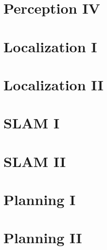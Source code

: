 \documentclass[8pt,landscape]{article}
\begin{document}
\begin{multicols}{3}
\blindtext[3]

\section{Perception IV}

\blindtext[3]

\section{Localization I}

\blindtext[3]

\section{Localization II}

\blindtext[3]

\section{SLAM I}

\blindtext[3]

\section{SLAM II}

\blindtext[3]

\section{Planning I}

\blindtext[3]

\section{Planning II}

\blindtext[3]





\end{multicols}

\end{document}
